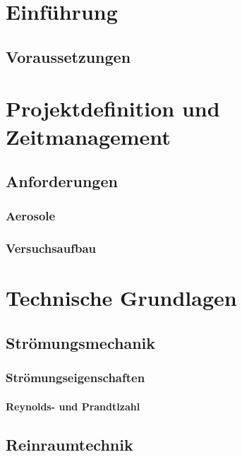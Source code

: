 \chapter{Einf\"{u}hrung}

\section{Voraussetzungen}


\chapter{Projektdefinition und Zeitmanagement}\label{ch:project}


\section{Anforderungen}
\subsection{Aerosole}
\subsection{Versuchsaufbau}

\chapter{Technische Grundlagen}\label{ch:foundations}
\section{Str\"{o}mungsmechanik}
\subsection{Str\"{o}mungseigenschaften}
\subsubsection{Reynolds- und Prandtlzahl}

\section{Reinraumtechnik}
